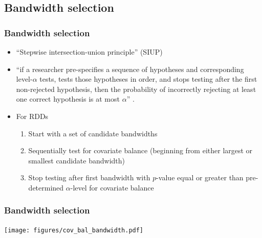 \documentclass[table, xcolor = {dvipsnames}, 9pt]{beamer}
\theoremstyle{plain}
\begin{document}
\subsection{Bandwidth selection}
\begin{frame}
\frametitle{Bandwidth selection} 
\begin{itemize} \vfill
\item ``Stepwise intersection-union principle'' (SIUP) \\ \citep{hansensales2015,rosenbaum2008,berger1988} \vfill
\item[] ``if a researcher pre-specifies a sequence of hypotheses and corresponding level-$\alpha$ tests, tests those hypotheses in order, and stops testing after the first non-rejected hypothesis, then the probability of incorrectly rejecting at least one correct hypothesis is at most $\alpha$'' \citep[p. 185]{hansensales2015}. \vfill
\item For RDDs \vfill
\begin{enumerate} \vfill
\item Start with a set of candidate bandwidths \vfill
\item Sequentially test for covariate balance (beginning from either largest or smallest candidate bandwidth) \vfill
\item Stop testing after first bandwidth with $p$-value equal or greater than pre-determined $\alpha$-level for covariate balance \vfill
\end{enumerate} \vfill
\end{itemize} \vfill
\end{frame}
\begin{frame}
\frametitle{Bandwidth selection} 
\vfill
\begin{center}
\texttt{[image: figures/cov\_bal\_bandwidth.pdf]}
\end{center}
\vfill
\end{frame}
\end{document}

